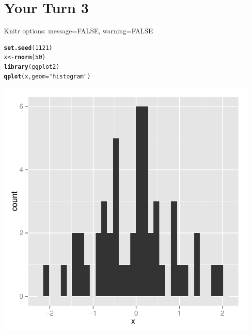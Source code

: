 \documentclass{article}\usepackage[]{graphicx}\usepackage[]{color}
\makeatletter
\newcommand{\hlnum}[1]{\textcolor[rgb]{0.686,0.059,0.569}{#1}}%
\newcommand{\hlstr}[1]{\textcolor[rgb]{0.192,0.494,0.8}{#1}}%
\newcommand{\hlstd}[1]{\textcolor[rgb]{0.345,0.345,0.345}{#1}}%
\newcommand{\hlkwb}[1]{\textcolor[rgb]{0.69,0.353,0.396}{#1}}%
\newcommand{\hlkwc}[1]{\textcolor[rgb]{0.333,0.667,0.333}{#1}}%
\newcommand{\hlkwd}[1]{\textcolor[rgb]{0.737,0.353,0.396}{\textbf{#1}}}%
\newenvironment{kframe}{%
 \def\at@end@of@kframe{}%
 \ifinner\ifhmode%
  \def\at@end@of@kframe{\end{minipage}}%
  \begin{minipage}{\columnwidth}%
 \fi\fi%
 \def\FrameCommand##1{\hskip\@totalleftmargin \hskip-\fboxsep
 \colorbox{shadecolor}{##1}\hskip-\fboxsep
     \hskip-\linewidth \hskip-\@totalleftmargin \hskip\columnwidth}%
 \MakeFramed {\advance\hsize-\width
   \@totalleftmargin\z@ \linewidth\hsize
   \@setminipage}}%
 {\par\unskip\endMakeFramed%
 \at@end@of@kframe}
\newenvironment{knitrout}{}{} %
\makeatother
\begin{document}
\section{Your Turn 3}
\noindent Knitr options: message=FALSE, warning=FALSE
\begin{knitrout}
\color{fgcolor}\begin{kframe}
\begin{alltt}
\hlkwd{set.seed}\hlstd{(}\hlnum{1121}\hlstd{)}
\hlstd{x} \hlkwb{<-} \hlkwd{rnorm}\hlstd{(}\hlnum{50}\hlstd{)}
\hlkwd{library}\hlstd{(ggplot2)}
\hlkwd{qplot}\hlstd{(x,} \hlkwc{geom} \hlstd{=} \hlstr{"histogram"}\hlstd{)}
\end{alltt}
\end{kframe}

{\centering \includegraphics[width=\textwidth]{figure/pretty-histogram2} 

}



\end{knitrout}
\end{document}

